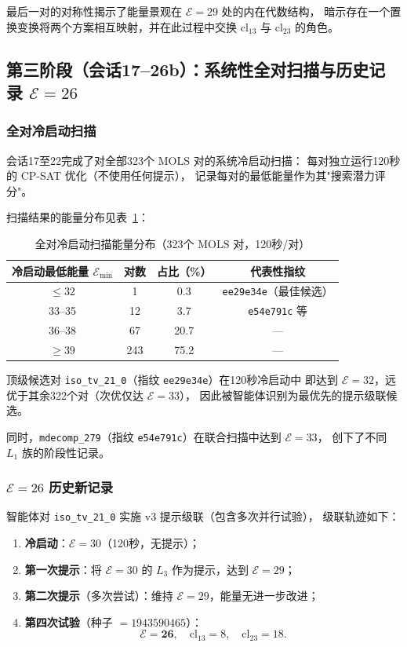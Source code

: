 \documentclass[11pt,a4paper]{ctexart}
\theoremstyle{remark}
\newcommand{\cl}{\mathrm{cl}}
\newcommand{\E}{\mathcal{E}}
\newcommand{\MOLS}{\mathrm{MOLS}}
\begin{document}
最后一对的对称性揭示了能量景观在 $\E = 29$ 处的内在代数结构，
暗示存在一个置换变换将两个方案相互映射，并在此过程中交换 $\cl_{13}$ 与 $\cl_{23}$ 的角色。

\subsection{第三阶段（会话17--26b）：系统性全对扫描与历史记录 $\E = 26$}

\subsubsection{全对冷启动扫描}

会话17至22完成了对全部323个 $\MOLS$ 对的系统冷启动扫描：
每对独立运行120秒的 CP-SAT 优化（不使用任何提示），
记录每对的最低能量作为其"搜索潜力评分"。

扫描结果的能量分布见表~\ref{tab:scan-results}：

\begin{table}[htbp]
  \centering
  \caption{全对冷启动扫描能量分布（323个 $\MOLS$ 对，120秒/对）}
  \label{tab:scan-results}
  \begin{tabular}{cccc}
    \toprule
    冷启动最低能量 $\E_{\min}$ & 对数 & 占比（\%） & 代表性指纹 \\
    \midrule
    $\le 32$ & 1  & 0.3 & \texttt{ee29e34e}（最佳候选） \\
    33--35   & 12 & 3.7 & \texttt{e54e791c} 等 \\
    36--38   & 67 & 20.7 & --- \\
    $\ge 39$ & 243 & 75.2 & --- \\
    \bottomrule
  \end{tabular}
\end{table}

顶级候选对 \texttt{iso\_tv\_21\_0}（指纹 \texttt{ee29e34e}）在120秒冷启动中
即达到 $\E = 32$，远优于其余322个对（次优仅达 $\E = 33$），
因此被智能体识别为最优先的提示级联候选。

同时，\texttt{mdecomp\_279}（指纹 \texttt{e54e791c}）在联合扫描中达到 $\E = 33$，
创下了不同 $L_1$ 族的阶段性记录。

\subsubsection{$\E = 26$ 历史新记录}

智能体对 \texttt{iso\_tv\_21\_0} 实施 v3 提示级联（包含多次并行试验），
级联轨迹如下：

\begin{enumerate}[leftmargin=2.5em,label=第\arabic*步.]
  \item \textbf{冷启动}：$\E = 30$（120秒，无提示）；
  \item \textbf{第一次提示}：将 $\E = 30$ 的 $L_3$ 作为提示，达到 $\E = 29$；
  \item \textbf{第二次提示}（多次尝试）：维持 $\E = 29$，能量无进一步改进；
  \item \textbf{第四次试验}（种子 $= 1943590465$）：
    \[
      \boxed{\E = \mathbf{26},\quad \cl_{13} = 8,\quad \cl_{23} = 18.}
    \]
\end{enumerate}
\end{document}
